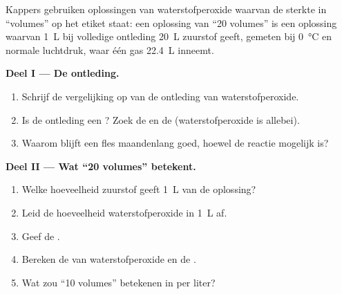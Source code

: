 \begin{problem}
\label{pb:g12:catalysis:1}
Kappers gebruiken oplossingen van waterstofperoxide waarvan de sterkte in
``volumes'' op het etiket staat: een oplossing van ``20 volumes'' is een
oplossing waarvan \qty{1}{L} bij volledige ontleding \qty{20}{L} zuurstof
geeft, gemeten bij \qty{0}{\celsius} en normale luchtdruk, waar één 
gas \qty{22.4}{L} inneemt.

\medskip
\noindent\textbf{Deel I --- De ontleding.}
\begin{enumerate}
  \item Schrijf de vergelijking op van de ontleding van waterstofperoxide.
  \item Is de ontleding een ? Zoek de  en de 
        (waterstofperoxide is allebei).
  \item Waarom blijft een fles maandenlang goed, hoewel de reactie
        mogelijk is?
\end{enumerate}

\medskip
\noindent\textbf{Deel II --- Wat ``20 volumes'' betekent.}
\begin{enumerate}[resume]
  \item Welke hoeveelheid zuurstof geeft \qty{1}{L} van de oplossing?
  \item Leid de hoeveelheid waterstofperoxide in \qty{1}{L} af.
  \item Geef de .
  \item Bereken de  van waterstofperoxide en de
        .
  \item Wat zou ``10 volumes'' betekenen in  per liter?
\end{enumerate}


\end{problem}
